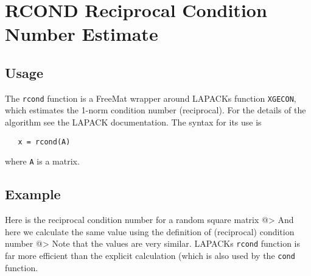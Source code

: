 \section{RCOND Reciprocal Condition Number Estimate}

\subsection{Usage}

The \verb|rcond| function is a FreeMat wrapper around LAPACKs
function \verb|XGECON|, which estimates the 1-norm condition
number (reciprocal).  For the details of the algorithm see
the LAPACK documentation.  The syntax for its use is
\begin{verbatim}
   x = rcond(A)
\end{verbatim}
where \verb|A| is a matrix.
\subsection{Example}

Here is the reciprocal condition number for a random square
matrix
@>
And here we calculate the same value using the definition of
(reciprocal) condition number
@>
Note that the values are very similar.  LAPACKs \verb|rcond|
function is far more efficient than the explicit calculation
(which is also used by the \verb|cond| function.
